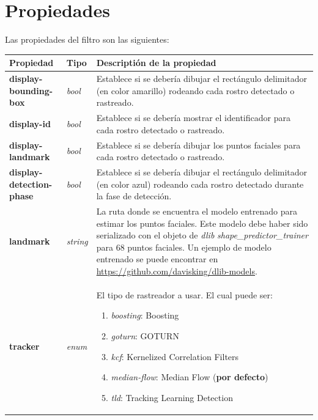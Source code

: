 \documentclass[a4paper,openright,12pt]{report}
\begin{document}
\section{Propiedades}
Las propiedades del filtro son las siguientes:
\begin{center}
  \begin{longtable}{| p{} | p{} | p{} |}
  \hline

  \textbf{Propiedad} &
  \textbf{Tipo} &
  \textbf{Descriptión de la propiedad}
  \\ \hline

  \textbf{display-bounding-box} &
  \textit{bool} &
  Establece si se debería dibujar el rectángulo delimitador (en color amarillo)
  rodeando cada rostro detectado o rastreado.
  \\ \hline

  \textbf{display-id} &
  \textit{bool} &
  Establece si se debería mostrar el identificador para cada rostro detectado o
  rastreado.
  \\ \hline

  \textbf{display-landmark} &
  \textit{bool} &
  Establece si se debería dibujar los puntos faciales para cada rostro detectado
  o rastreado.
  \\ \hline

  \textbf{display-detection-phase} &
  \textit{bool} &
  Establece si se debería dibujar el rectángulo delimitador (en color azul)
  rodeando cada rostro detectado durante la fase de detección.
  \\ \hline

  \textbf{landmark} &
  \textit{string} &
  La ruta donde se encuentra el modelo entrenado para estimar los puntos
  faciales. Este modelo debe haber sido serializado con el objeto de
  \textit{dlib} \textit{shape\_predictor\_trainer} para 68 puntos faciales. Un
  ejemplo de modelo entrenado se puede encontrar en
  \href{https://github.com/davisking/dlib-models}{https://github.com/davisking/dlib-models}.
  \\ \hline

  \textbf{tracker} &
  \textit{enum} &
  El tipo de rastreador a usar. El cual puede ser:
  \begin{enumerate}
    \setcounter{enumi}{0}
    \item \textit{boosting}: Boosting
    \item \textit{goturn}: GOTURN
    \item \textit{kcf}: Kernelized Correlation Filters
    \item \textit{median-flow}: Median Flow (\textbf{por defecto})
    \item \textit{tld}: Tracking Learning Detection
  \end{enumerate}
  \\ \hline


\end{longtable}
\end{center}
\end{document}
